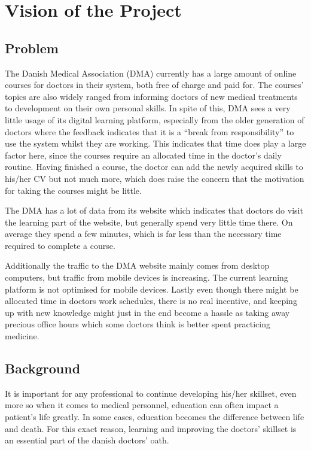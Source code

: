 \section{Vision of the Project}

\subsection{Problem}
The Danish Medical Association (DMA) currently has a large amount of online courses for doctors in their system, both free of charge and paid for. The courses’ topics are also widely ranged from informing doctors of new medical treatments to development on their own personal skills. In spite of this, DMA sees a very little usage of its digital learning platform, especially from the older generation of doctors where the feedback indicates that it is a “break from responsibility” to use the system whilst they are working. This indicates that time does play a large factor here, since the courses require an allocated time in the doctor’s daily routine. Having finished a course, the doctor can add the newly acquired skills to his/her CV but not much more, which does raise the concern that the motivation for taking the courses might be little.

The DMA has a lot of data from its website which indicates that doctors do visit the learning part of the website, but generally spend very little time there. On average they spend a few minutes, which is far less than the necessary time required to complete a course.

Additionally the traffic to the DMA website mainly comes from desktop computers, but traffic from mobile devices is increasing. The current learning platform is not optimised for mobile devices.
Lastly even though there might be allocated time in doctors work schedules, there is no real incentive, and keeping up with new knowledge might just in the end become a hassle as taking away precious office hours which some doctors think is better spent practicing medicine.

\subsection{Background}
It is important for any professional to continue developing his/her skillset, even more so when it comes to medical personnel, education can often impact a patient’s life greatly. In some cases, education becomes the difference between life and death. For this exact reason, learning and improving the doctors’ skillset is an essential part of the danish doctors’ oath.


